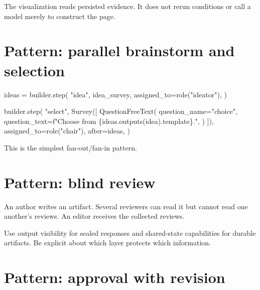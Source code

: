 \documentclass[
  10pt,
]{report}
\newenvironment{Shaded}{}{}
\newcommand{\NormalTok}[1]{#1}
\newcommand{\OperatorTok}[1]{\textcolor[rgb]{0.40,0.40,0.40}{#1}}
\newcommand{\SpecialCharTok}[1]{\textcolor[rgb]{0.25,0.44,0.63}{#1}}
\newcommand{\SpecialStringTok}[1]{\textcolor[rgb]{0.73,0.40,0.53}{#1}}
\newcommand{\StringTok}[1]{\textcolor[rgb]{0.25,0.44,0.63}{#1}}
\begin{document}
The visualization reads persisted evidence. It does not rerun conditions
or call a model merely to construct the page.

\chapter{Pattern: parallel brainstorm and
selection}\label{pattern-parallel-brainstorm-and-selection}

\begin{Shaded}
\begin{Highlighting}[]
\NormalTok{ideas }\OperatorTok{=}\NormalTok{ builder.step(}
    \StringTok{"idea"}\NormalTok{,}
\NormalTok{    idea\_survey,}
\NormalTok{    assigned\_to}\OperatorTok{=}\NormalTok{role(}\StringTok{"ideator"}\NormalTok{),}
\NormalTok{)}

\NormalTok{builder.step(}
    \StringTok{"select"}\NormalTok{,}
\NormalTok{    Survey([}
\NormalTok{        QuestionFreeText(}
\NormalTok{            question\_name}\OperatorTok{=}\StringTok{"choice"}\NormalTok{,}
\NormalTok{            question\_text}\OperatorTok{=}\SpecialStringTok{f"Choose from }\SpecialCharTok{\{}\NormalTok{ideas}\SpecialCharTok{.}\NormalTok{outputs(}\StringTok{\textquotesingle{}idea\textquotesingle{}}\NormalTok{)}\SpecialCharTok{.}\NormalTok{template}\SpecialCharTok{\}}\SpecialStringTok{."}\NormalTok{,}
\NormalTok{        )}
\NormalTok{    ]),}
\NormalTok{    assigned\_to}\OperatorTok{=}\NormalTok{role(}\StringTok{"chair"}\NormalTok{),}
\NormalTok{    after}\OperatorTok{=}\NormalTok{ideas,}
\NormalTok{)}
\end{Highlighting}
\end{Shaded}

This is the simplest fan-out/fan-in pattern.

\chapter{Pattern: blind review}\label{pattern-blind-review}

An author writes an artifact. Several reviewers can read it but cannot
read one another's reviews. An editor receives the collected reviews.

Use output visibility for sealed responses and shared-state capabilities
for durable artifacts. Be explicit about which layer protects which
information.

\chapter{Pattern: approval with
revision}\label{pattern-approval-with-revision}
\end{document}
